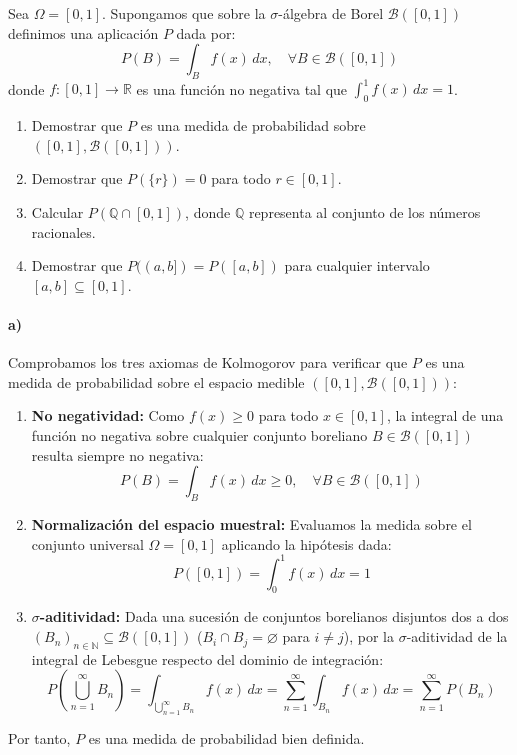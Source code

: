 \begin{problema}
Sea $\Omega = [0,1]$. Supongamos que sobre la $\sigma$-álgebra de Borel $\mathcal{B}([0,1])$ definimos una aplicación $P$ dada por:
\[
    P(B) = \int_B f(x) \, dx, \quad \forall B \in \mathcal{B}([0,1])
\]
donde $f : [0,1] \to \mathbb{R}$ es una función no negativa tal que $\displaystyle \int_0^1 f(x) \, dx = 1$.
\begin{enumerate}[label=\alph*)]
    \item Demostrar que $P$ es una medida de probabilidad sobre $([0,1], \mathcal{B}([0,1]))$.
    \item Demostrar que $P(\{r\}) = 0$ para todo $r \in [0,1]$.
    \item Calcular $P(\mathbb{Q} \cap [0,1])$, donde $\mathbb{Q}$ representa al conjunto de los números racionales.
    \item Demostrar que $P((a,b]) = P([a,b])$ para cualquier intervalo $[a,b] \subseteq [0,1]$.
\end{enumerate}

\tcblower

\paragraph{a)}
Comprobamos los tres axiomas de Kolmogorov para verificar que $P$ es una medida de probabilidad sobre el espacio medible $([0,1], \mathcal{B}([0,1]))$:
\begin{enumerate}[label=\arabic*.]
    \item \textbf{No negatividad:} Como $f(x) \ge 0$ para todo $x \in [0,1]$, la integral de una función no negativa sobre cualquier conjunto boreliano $B \in \mathcal{B}([0,1])$ resulta siempre no negativa:
    \[
        P(B) = \int_B f(x) \, dx \ge 0, \quad \forall B \in \mathcal{B}([0,1])
    \]
    \item \textbf{Normalización del espacio muestral:} Evaluamos la medida sobre el conjunto universal $\Omega = [0,1]$ aplicando la hipótesis dada:
    \[
        P([0,1]) = \int_0^1 f(x) \, dx = 1
    \]
    \item \textbf{$\sigma$-aditividad:} Dada una sucesión de conjuntos borelianos disjuntos dos a dos $(B_n)_{n \in \mathbb{N}} \subseteq \mathcal{B}([0,1])$ ($B_i \cap B_j = \varnothing$ para $i \neq j$), por la $\sigma$-aditividad de la integral de Lebesgue respecto del dominio de integración:
    \[
        P\left( \bigcup_{n=1}^\infty B_n \right) = \int_{\bigcup_{n=1}^\infty B_n} f(x) \, dx = \sum_{n=1}^\infty \int_{B_n} f(x) \, dx = \sum_{n=1}^\infty P(B_n)
    \]
\end{enumerate}
Por tanto, $P$ es una medida de probabilidad bien definida.


\end{problema}
